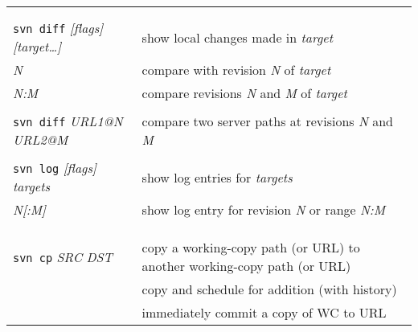 \documentclass{report}
\begin{document}
\newpage
\hspace{-0.7in}
\begin{tabular}{ll}

\\
\\
\vspace{0.1in} \hspace{-0.1in}{\bf\Large Examining History} & \\

{\tt svn diff} {\sl [flags]} {\sl [target\dots]}  &
show local changes made in {\sl target}		  \\

\hspace{0.5in}{\tt -r} {\sl N}		&
compare with revision {\sl N} of {\sl target} 	 \\

\hspace{0.5in}{\tt -r} {\sl N:M}		&
compare revisions {\sl N} and {\sl M} of {\sl target} 	 \\

\\
{\tt svn diff} {\sl URL1@N} {\sl URL2@M}  &
compare two server paths at revisions {\sl N} and {\sl M}	  \\

\\
{\tt svn log} {\sl [flags]} {\sl targets}		&
show log entries for {\sl targets}			 \\

\hspace{0.5in}{\tt -r} {\sl N[:M]}		&
show log entry for revision {\sl N} or range {\sl N:M}  \\

\\
\\
\vspace{0.1in} \hspace{-0.1in}{\bf\Large Branches and Tags} & \\

{\tt svn cp} {\sl SRC} {\sl DST}		&
copy a working-copy path (or URL) to another working-copy path (or URL)  \\

\hspace{0.5in}{\tt WC => WC}		&
copy and schedule for addition (with history)  \\

\hspace{0.5in}{\tt WC => URL}		&
immediately commit a copy of WC to URL  \\


\end{tabular}
\end{document}
